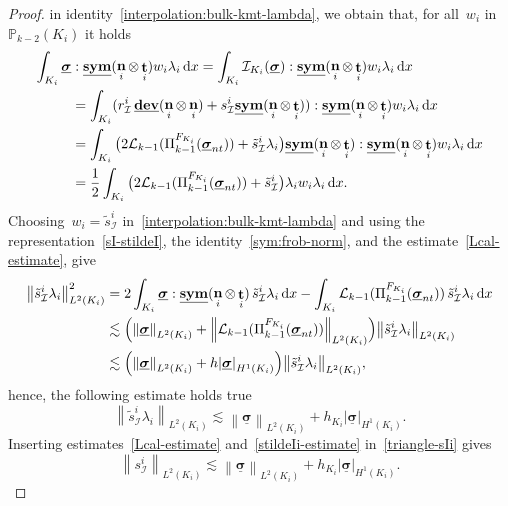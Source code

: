 \documentclass[a4paper,twoside,10pt]{article}
\theoremstyle{plain}
\theoremstyle{remark}
\theoremstyle{definition}
\numberwithin{equation}{section}
\numberwithin{figure}{section}
\newcommand{\Norm}[1]{{\left\|{#1} \right\|}}
\newcommand{\SemiNorm}[1]{{\left|{#1} \right|}}
\newcommand{\Pbbkmt}{\mathbb{P}_{k-2}}
\newcommand{\K}{K}
\newcommand{\F}{F}
\newcommand{\sigmabf}{\underline{\boldsymbol{\sigma}}}
\DeclareMathOperator{\dev}{\underline{\mathbf{dev}}}
\newcommand{\normtang}{{nt}}
\newcommand{\sym}{\underline{\bf{sym}}}
\DeclareMathOperator{\norm}{\bf{n}}
\DeclareMathOperator{\tang}{\bf{t}}
\newcommand{\Ltwo}{L^2}
\newcommand{\dx}{\, \mathrm{d}x}
\newcommand{\lambdai}{\lambda_i}
\newcommand{\Ki}{{\K_i}}
\newcommand{\Fi}{{\F_{\Ki}}}
\newcommand{\normi}{\norm_i}
\newcommand{\tangi}{\tang_i}
\newcommand{\hKi}{h_{\Ki}}
\newcommand{\IcalKi}{\mathcal{I}_{\Ki}}
\newcommand{\sIi}{s_{\mathcal{I}}^i}
\newcommand{\rIi}{r_{\mathcal{I}}^i}
\newcommand{\PikmoFi}{\Pi_{k-1}^{\Fi}}
\newcommand{\Lcalkmo}{\mathcal{L}_{k-1}}
\newcommand{\stildeIi}{\tilde{s}^i_{\mathcal{I}}}
\newcommand{\wi}{w_i}
\begin{document}
\begin{proof}
in identity~\eqref{interpolation:bulk-kmt-lambda},
we obtain that,
for all~$\wi$ in~$\Pbbkmt(\Ki)$
it holds
\begin{equation*}
\begin{split}
\int_{\Ki} \sigmabf &: \sym(\normi\otimes\tangi)\wi\lambdai\dx
=\int_{\Ki} \IcalKi(\sigmabf) : \sym(\normi\otimes\tangi)\wi\lambdai \dx \\
&= \int_{\Ki} (\rIi\dev(\normi\otimes\normi) + \sIi\sym(\normi\otimes\tangi)) : \sym(\normi\otimes\tangi)\wi\lambdai \dx \\
&= \int_{\Ki} \big(2\Lcalkmo(\PikmoFi(\sigmabf_{\normtang})) + \stildeIi\lambdai\big) \sym(\normi\otimes\tangi) : \sym(\normi\otimes\tangi)\wi\lambdai \dx \\
&= \frac12\int_{\Ki} \big(2\Lcalkmo(\PikmoFi(\sigmabf_{\normtang})) + \stildeIi\big)\lambdai\wi\lambdai \dx.
\end{split}
\end{equation*}
Choosing~$\wi = \stildeIi$ in~\eqref{interpolation:bulk-kmt-lambda} and
using the representation~\eqref{sI-stildeI},
the identity~\eqref{sym:frob-norm},
and the estimate~\eqref{Lcal-estimate},
give
\begin{equation*} 
\begin{split}
\Norm{\stildeIi\lambdai}^2_{\Ltwo(\Ki)}
&= 2\int_{\Ki}\sigmabf:\sym(\normi\otimes\tangi)\,\stildeIi\lambdai\dx
    - \int_{\Ki}\Lcalkmo(\PikmoFi(\sigmabf_{\normtang}))\,\stildeIi\lambdai\dx \\
&\lesssim \Big(\Norm{\sigmabf}_{\Ltwo(\Ki)}
    + \Norm{\Lcalkmo(\PikmoFi(\sigmabf_{\normtang}))}_{\Ltwo(\Ki)}\Big)
    \Norm{\stildeIi\lambdai}_{\Ltwo(\Ki)} \\
&\lesssim\Big(\Norm{\sigmabf}_{\Ltwo(\Ki)} + h\SemiNorm{\sigmabf}_{H^1(\Ki)}\Big)
     \Norm{\stildeIi\lambdai}_{\Ltwo(\Ki)},
\end{split}
\end{equation*}
hence,
the following estimate holds true
\begin{equation} \label{stildeIi-estimate}
\Norm{\stildeIi\lambdai}_{\Ltwo(\Ki)} \lesssim \Norm{\sigmabf}_{\Ltwo(\Ki)} + \hKi\SemiNorm{\sigmabf}_{H^1(\Ki)}.
\end{equation}
Inserting estimates~\eqref{Lcal-estimate} and~\eqref{stildeIi-estimate} in~\eqref{triangle-sIi}
gives
\begin{equation} \label{sIi-estimate}
\Norm{\sIi}_{\Ltwo(\Ki)} \lesssim \Norm{\sigmabf}_{\Ltwo(\Ki)} + \hKi\SemiNorm{\sigmabf}_{H^1(\Ki)}.
\end{equation}


\end{proof}
\end{document}
